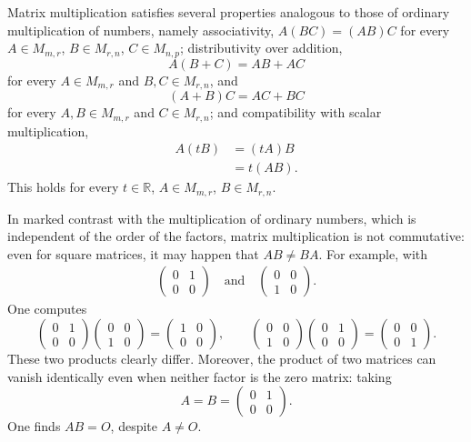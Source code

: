 Matrix multiplication satisfies several properties analogous to those of ordinary multiplication of numbers, namely associativity, $A(BC) = (AB)C$ for every $A \in M_{m,r}$, $B \in M_{r,n}$, $C \in M_{n,p}$; distributivity over addition,
\[
A(B+C) = AB + AC
\]
 for every $A \in M_{m,r}$ and $B, C \in M_{r,n}$, and
\[
(A+B)C = AC + BC
\]
 for every $A, B \in M_{m,r}$ and $C \in M_{r,n}$; and compatibility with scalar multiplication,
\[
\begin{aligned}
A(tB) &= (tA)B \\
&= t(AB).
\end{aligned}
\]
This holds for every $t \in \mathbb{R}$, $A \in M_{m,r}$, $B \in M_{r,n}$.

\begin{remark}
In marked contrast with the multiplication of ordinary numbers, which is independent of the order of the factors, matrix multiplication is not commutative: even for square matrices, it may happen that $AB \neq BA$. For example, with
\[
\begin{gathered}
\begin{pmatrix} 0 & 1 \\ 0 & 0 \end{pmatrix} \quad \text{and} \quad
\begin{pmatrix} 0 & 0 \\ 1 & 0 \end{pmatrix}.
\end{gathered}
\]
One computes
\[
\begin{pmatrix} 0 & 1 \\ 0 & 0 \end{pmatrix}\begin{pmatrix} 0 & 0 \\ 1 & 0 \end{pmatrix} = \begin{pmatrix} 1 & 0 \\ 0 & 0 \end{pmatrix}, \qquad
\begin{pmatrix} 0 & 0 \\ 1 & 0 \end{pmatrix}\begin{pmatrix} 0 & 1 \\ 0 & 0 \end{pmatrix} = \begin{pmatrix} 0 & 0 \\ 0 & 1 \end{pmatrix}.
\]
These two products clearly differ. Moreover, the product of two matrices can vanish identically even when neither factor is the zero matrix: taking
\[
A = B = \begin{pmatrix} 0 & 1 \\ 0 & 0 \end{pmatrix}.
\]
One finds $AB = O$, despite $A \neq O$.
\end{remark}


